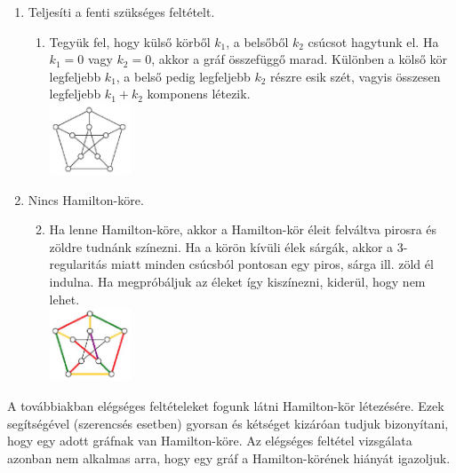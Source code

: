 \documentclass[../../szobeli.tex]{subfiles}
\begin{document}
\begin{itemize}
                \begin{enumerate}
                    \item Teljesíti a fenti szükséges feltételt. 
                        \begin{enumerate}
                            \item Tegyük fel, hogy külső körből $k_1$, a belsőből $k_2$ csúcsot hagytunk el. Ha $k_1 = 0$ vagy $k_2 = 0$, akkor a gráf összefüggő marad. Különben a kölső kör legfeljebb $k_1$, a belső pedig legfeljebb $k_2$ részre esik szét, vagyis összesen legfeljebb $k_1 + k_2$ komponens létezik. \\ \includegraphics[width=0.2\textwidth]{./img/5.png}
                        \end{enumerate}
                    \item Nincs Hamilton-köre.
                        \begin{enumerate}
                            \setcounter{enumi}{1}
                            \item Ha lenne Hamilton-köre, akkor a Hamilton-kör éleit felváltva pirosra és zöldre tudnánk színezni. Ha a körön kívüli élek sárgák, akkor a 3-regularitás miatt minden csúcsból pontosan egy piros, sárga ill. zöld él indulna. Ha megpróbáljuk az éleket így kiszínezni, kiderül, hogy nem lehet. \\ \includegraphics[width=0.2\textwidth]{./img/6.png}
                        \end{enumerate}
                \end{enumerate}
            
            A továbbiakban elégséges feltételeket fogunk látni Hamilton-kör létezésére. Ezek segítségével (szerencsés esetben) gyorsan és kétséget kizáróan tudjuk bizonyítani, hogy egy adott gráfnak van Hamilton-köre. Az elégséges feltétel vizsgálata azonban nem alkalmas arra, hogy egy gráf a Hamilton-körének hiányát igazoljuk.


\end{itemize}
\end{document}
